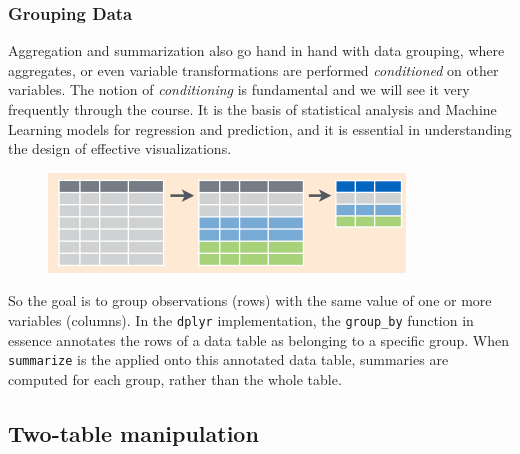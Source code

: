 \documentclass[]{article}
\newenvironment{Shaded}{\begin{snugshade}}{\end{snugshade}}
\newcommand{\KeywordTok}[1]{\textcolor[rgb]{0.13,0.29,0.53}{\textbf{{#1}}}}
\newcommand{\DataTypeTok}[1]{\textcolor[rgb]{0.13,0.29,0.53}{{#1}}}
\newcommand{\StringTok}[1]{\textcolor[rgb]{0.31,0.60,0.02}{{#1}}}
\newcommand{\CommentTok}[1]{\textcolor[rgb]{0.56,0.35,0.01}{\textit{{#1}}}}
\newcommand{\OtherTok}[1]{\textcolor[rgb]{0.56,0.35,0.01}{{#1}}}
\newcommand{\NormalTok}[1]{{#1}}
\theoremstyle{definition}
\theoremstyle{definition}
\theoremstyle{remark}
\begin{document}
\subsubsection{Grouping Data}\label{grouping-data}

Aggregation and summarization also go hand in hand with data grouping,
where aggregates, or even variable transformations are performed
\emph{conditioned} on other variables. The notion of \emph{conditioning}
is fundamental and we will see it very frequently through the course. It
is the basis of statistical analysis and Machine Learning models for
regression and prediction, and it is essential in understanding the
design of effective visualizations.

\begin{figure}[htbp]
\centering
\includegraphics{img/groupby.png}
\caption{}
\end{figure}

So the goal is to group observations (rows) with the same value of one
or more variables (columns). In the \texttt{dplyr} implementation, the
\texttt{group\_by} function in essence annotates the rows of a data
table as belonging to a specific group. When \texttt{summarize} is the
applied onto this annotated data table, summaries are computed for each
group, rather than the whole table.

\begin{Shaded}
\end{Shaded}

\subsection{Two-table manipulation}\label{two-table-manipulation}
\end{document}
